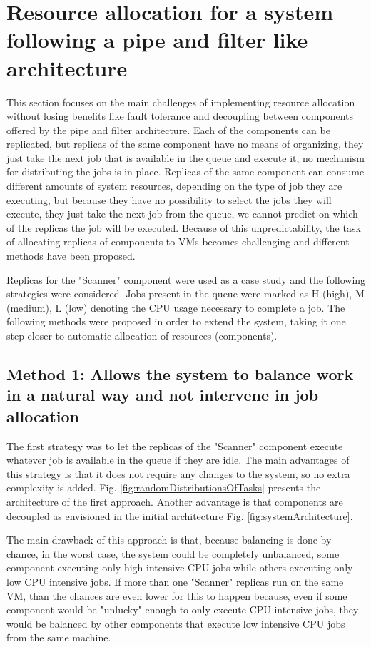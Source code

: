 \section{Resource allocation for a system following a pipe and filter like architecture}
\label{sec:resourceAllocation}
This section focuses on the main challenges of implementing resource allocation without losing benefits like fault tolerance and decoupling between components offered by the pipe and filter architecture. Each of the components can be replicated, but replicas of the same component have no means of organizing, they just take the next job that is available in the queue and execute it, no mechanism for distributing the jobs is in place. Replicas of the same component can consume different amounts of system resources, depending on the type of job they are executing, but because they have no possibility to select the jobs they will execute, they just take the next job from the queue, we cannot predict on which of the replicas the job will be executed. Because of this unpredictability, the task of allocating replicas of components to VMs becomes challenging and different methods have been proposed.

Replicas for the "Scanner" component were used as a case study and the following strategies were considered. Jobs present in the queue were marked as H (high), M (medium), L (low) denoting the CPU usage necessary to complete a job. The following methods were proposed in order to extend the system, taking it one step closer to automatic allocation of resources (components).

\subsection{Method 1: Allows the system to balance work in a natural way and not intervene in job allocation}
\label{subsection:method1}
The first strategy was to let the replicas of the "Scanner" component execute whatever job is available in the queue if they are idle. The main advantages of this strategy is that it does not require any changes to the system, so no extra complexity is added. Fig. \ref{fig:randomDistributionsOfTasks} presents the architecture of the first approach. Another advantage is that components are decoupled as envisioned in the initial architecture Fig. \ref{fig:systemArchitecture}.

The main drawback of this approach is that, because balancing is done by chance, in the worst case, the system could be completely unbalanced, some component executing only high intensive CPU jobs while others executing only low CPU intensive jobs. If more than one "Scanner" replicas run on the same VM, than the chances are even lower for this to happen because, even if some component would be "unlucky" enough to only execute CPU intensive jobs, they would be balanced by other components that execute low intensive CPU jobs from the same machine.

